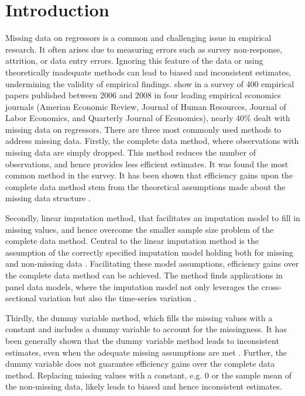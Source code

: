 \section{Introduction}
Missing data on regressors is a common and challenging issue in empirical research.
It often arises due to measuring errors such as survey non-response, attrition, or data entry errors.
Ignoring this feature of the data or using theoretically inadequate methods can lead to biased and inconsistent estimates, undermining the validity of empirical findings.
\citet{abrevaya2017} show in a survey of 400 empirical papers published between 2006 and 2008 in four leading empirical economics journals (Amerian Economic Review,
Journal of Human Resources, Journal of Labor Economics, and Quarterly Journal of Economics), nearly 40\% dealt with missing data on regressors.
There are three most commonly used methods to address missing data.
Firstly, the complete data method, where observations with missing data are simply dropped.
This method reduces the number of observations, and hence provides less efficient estimates.
It was found the most common method in the survey.
It has been shown that efficiency gains upon the complete data method stem from the theoretical assumptions made about the missing data structure \citep{dardanoni2011}.

Secondly, linear imputation method, that facilitates an imputation model to fill in missing values, and hence overcome the smaller sample size problem of the complete data method.
Central to the linear imputation method is the assumption of the correctly specified imputation model holding both for missing and non-missing data \citep{dagenais1973, gourieroux1981}.
Facilitating these model assumptions, efficiency gains over the complete data method can be achieved.
The method finds applications in panel data models, where the imputation model not only leverages the cross-sectional variation but also the time-series variation \citep{frick2014}.

Thirdly, the dummy variable method, which fills the missing values with a constant and includes a dummy variable to account for the missingness.
It has been generally shown that the dummy variable method leads to inconsistent estimates, even when the adequate missing assumptions are met \citep{jones1996}.
Further, the dummy variable does not guarantee efficiency gains over the complete data method.
Replacing missing values with a constant, e.g. 0 or the sample mean of the non-missing data, likely leads to biased and hence inconsistent estimates.

